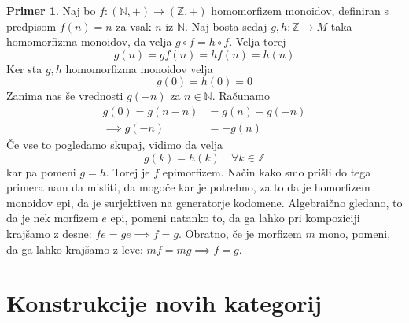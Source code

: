 \documentclass[12pt,a4paper]{book}
\theoremstyle{definition}
\theoremstyle{plain}
\theoremstyle{definition}
\newtheorem{primer}{Primer}[section]
\theoremstyle{remark}
\begin{document}
\begin{primer}
Naj bo $f : (\mathbb{N},+) \to (\mathbb{Z},+)$ homomorfizem monoidov, definiran s predpisom $f(n) = n$ za vsak $n$ iz $\mathbb{N}$. Naj bosta sedaj $g,h: \mathbb{Z} \to M$ taka homomorfizma monoidov, da velja $g \circ f = h \circ f$. 
Velja torej $$g(n) = gf(n) = hf(n) = h(n)$$
Ker sta $g,h$ homomorfizma monoidov velja
$$g(0) = h(0) = 0$$
Zanima nas še vrednosti $g(-n)$ za $n \in \mathbb{N}$. 
Računamo 
\begin{align*}
g(0) = g(n - n) &= g(n) + g(-n) \\
\implies g(-n) &= -g(n)
\end{align*}
Če vse to pogledamo skupaj, vidimo da velja
$$g(k) = h(k) \quad \forall k \in \mathbb{Z}$$
kar pa pomeni $g = h$. Torej je $f$ epimorfizem. Način kako smo prišli do tega primera nam da misliti, da mogoče kar je potrebno, za to da je homorfizem monoidov epi, da je surjektiven na generatorje kodomene.
Algebraično gledano, to da je nek morfizem $e$ epi, pomeni natanko to, da ga lahko pri kompoziciji krajšamo z desne: $fe = ge \implies f=g$. Obratno, če je morfizem $m$ mono, pomeni, da ga lahko krajšamo z leve: $mf = mg \implies f = g$.

\end{primer}


\section{Konstrukcije novih kategorij}
\end{document}
